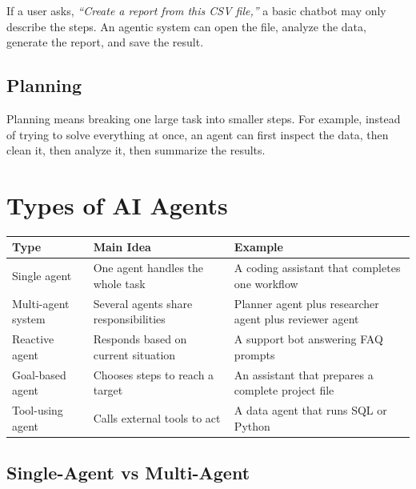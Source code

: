 \documentclass[11pt,a4paper]{article}
\begin{document}
\begin{examplebox}
If a user asks, \textit{``Create a report from this CSV file,''} a basic chatbot may only describe the steps. An agentic system can open the file, analyze the data, generate the report, and save the result.
\end{examplebox}

\subsection{Planning}

\begin{conceptbox}[Planning]
Planning means breaking one large task into smaller steps. For example, instead of trying to solve everything at once, an agent can first inspect the data, then clean it, then analyze it, then summarize the results.
\end{conceptbox}

\section{Types of AI Agents}

\begin{longtable}{@{}p{3.4cm}p{3.5cm}p{5.9cm}@{}}
\toprule
\rowcolor{primary!15}
\textbf{Type} & \textbf{Main Idea} & \textbf{Example} \\
\midrule
\endhead
Single agent & One agent handles the whole task & A coding assistant that completes one workflow \\
\addlinespace
Multi-agent system & Several agents share responsibilities & Planner agent plus researcher agent plus reviewer agent \\
\addlinespace
Reactive agent & Responds based on current situation & A support bot answering FAQ prompts \\
\addlinespace
Goal-based agent & Chooses steps to reach a target & An assistant that prepares a complete project file \\
\addlinespace
Tool-using agent & Calls external tools to act & A data agent that runs SQL or Python \\
\bottomrule
\end{longtable}

\subsection{Single-Agent vs Multi-Agent}
\end{document}
